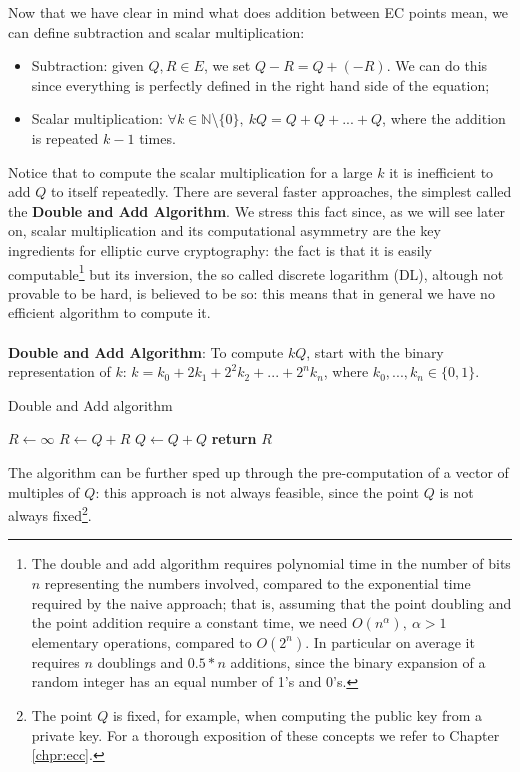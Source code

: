 \bigskip
\noindent
Now that we have clear in mind what does addition between EC points mean, we can define subtraction and scalar multiplication:
\begin{itemize}
	\item Subtraction: given $Q, R \in E$, we set $Q - R = Q + (-R)$. We can do this since everything is perfectly defined in the right hand side of the equation;
	\item Scalar multiplication: $\forall k \in \mathbb{N}$\textbackslash$\{0\}, \ kQ = Q + Q + ... + Q$, where the addition is repeated $k - 1$ times.
\end{itemize}
Notice that to compute the scalar multiplication for a large $k$ it is inefficient to add $Q$ to itself repeatedly. There are several faster approaches, the simplest called the {\bf Double and Add Algorithm}. 
We stress this fact since, as we will see later on, scalar multiplication and its computational asymmetry are the key ingredients for elliptic curve cryptography: the fact is that it is easily computable\footnote{The double and add algorithm requires polynomial time in the number of bits $n$ representing the numbers involved, compared to the exponential time required by the naive approach; that is, assuming that the point doubling and the point addition require a constant time, we need $O(n^{\alpha}), \ \alpha > 1$ elementary operations, compared to $O(2^n)$. In particular on average it requires $n$ doublings and $0.5 * n$  additions, since the binary expansion of a random integer has an equal number of 1's and 0's.}
but its inversion, the so called discrete logarithm (DL), altough not provable to be hard, is believed to be so: this means that in general we have no efficient algorithm to compute it.
\\
\\
{\bf Double and Add Algorithm}: To compute $kQ$, start with the binary representation of $k$: $k = k_0 + 2k_1 + 2^2k_2 + ... + 2^nk_n$, where $k_0,...,k_n \in \{0, 1\}$. 

\begin{algorithm}
	\caption{Double and Add algorithm}
	\label{alg:double_add}
	\begin{algorithmic}[1]
		\State $R \gets \infty$
		\State $R \gets Q + R$
		\EndIf
		\State $Q \gets Q + Q$
		\EndFor
		\State \textbf{return} $R$
		\EndProcedure
	\end{algorithmic}
\end{algorithm}
\noindent
The algorithm can be further sped up through the pre-computation of a vector of multiples of $Q$: this approach is not always feasible, since the point $Q$ is not always fixed\footnote{The point $Q$ is fixed, for example, when computing the public key from a private key. For a thorough exposition of these concepts we refer to Chapter \ref{chpr:ecc}.}.